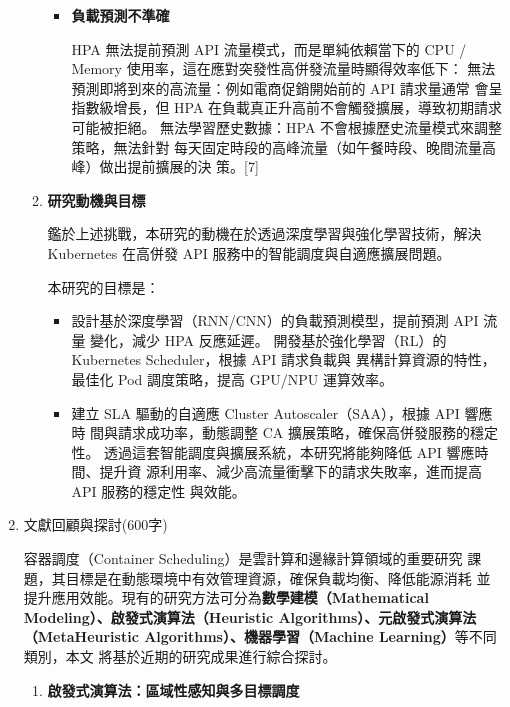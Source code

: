 \documentclass[12pt,a4paper]{article}
\begin{document}
\begin{enumerate}[label={(\zhdig*)}, leftmargin=2\parindent, listparindent=\parindent]
\begin{enumerate}[label={(\arabic*)}, leftmargin=\parindent, listparindent=\parindent]
\begin{itemize}[leftmargin=\parindent, listparindent=\parindent]
    \item \textbf{
負載預測不準確
}

HPA 無法提前預測 API 流量模式，而是單純依賴當下的 CPU /
Memory 使用率，這在應對突發性高併發流量時顯得效率低下：
無法預測即將到來的高流量：例如電商促銷開始前的 API 請求量通常
會呈指數級增長，但 HPA 在負載真正升高前不會觸發擴展，導致初期請求
可能被拒絕。
無法學習歷史數據：HPA 不會根據歷史流量模式來調整策略，無法針對
每天固定時段的高峰流量（如午餐時段、晚間流量高峰）做出提前擴展的決
策。[7]

    \end{itemize}
    \item \textbf{研究動機與目標}

鑑於上述挑戰，本研究的動機在於透過深度學習與強化學習技術，解決
Kubernetes 在高併發 API 服務中的智能調度與自適應擴展問題。

本研究的目標是：
\begin{itemize}[leftmargin=\parindent, listparindent=\parindent]

    \item 設計基於深度學習（RNN/CNN）的負載預測模型，提前預測 API 流量
變化，減少 HPA 反應延遲。
開發基於強化學習（RL）的 Kubernetes Scheduler，根據 API 請求負載與
異構計算資源的特性，最佳化 Pod 調度策略，提高 GPU/NPU 運算效率。

    \item 建立 SLA 驅動的自適應 Cluster Autoscaler（SAA），根據 API 響應時
間與請求成功率，動態調整 CA 擴展策略，確保高併發服務的穩定性。
透過這套智能調度與擴展系統，本研究將能夠降低 API 響應時間、提升資
源利用率、減少高流量衝擊下的請求失敗率，進而提高 API 服務的穩定性
與效能。
\end{itemize}

\end{enumerate}
\item 文獻回顧與探討(600字)

容器調度（Container Scheduling）是雲計算和邊緣計算領域的重要研究
課題，其目標是在動態環境中有效管理資源，確保負載均衡、降低能源消耗
並提升應用效能。現有的研究方法可分為\textbf{數學建模（Mathematical
Modeling）、啟發式演算法（Heuristic Algorithms）、元啟發式演算法（MetaHeuristic Algorithms）、機器學習（Machine Learning）}等不同類別，本文
將基於近期的研究成果進行綜合探討。
\begin{enumerate}[label={(\arabic*)}, leftmargin=\parindent, listparindent=\parindent]

    \item \textbf{
啟發式演算法：區域性感知與多目標調度}


\end{enumerate}
\end{enumerate}
\end{document}

